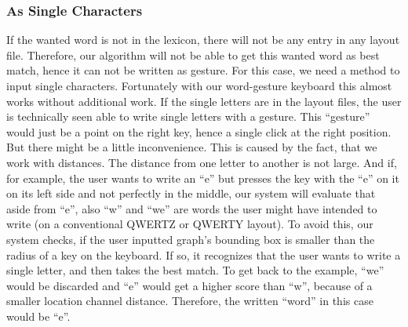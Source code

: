\subsubsection{As Single Characters}
If the wanted word is not in the lexicon, there will not be any entry in any layout file. Therefore, our algorithm will not be able to get this wanted word as best match, hence it can not be written as gesture. For this case, we need a method to input single characters. Fortunately with our word-gesture keyboard this almost works without additional work. If the single letters are in the layout files, the user is technically seen able to write single letters with a gesture. This ``gesture'' would just be a point on the right key, hence a single click at the right position. But there might be a little inconvenience. This is caused by the fact, that we work with distances. The distance from one letter to another is not large. And if, for example, the user wants to write an ``e'' but presses the key with the ``e'' on it on its left side and not perfectly in the middle, our system will evaluate that aside from ``e'', also ``w'' and ``we'' are words the user might have intended to write (on a conventional QWERTZ or QWERTY layout). To avoid this, our system checks, if the user inputted graph's bounding box is smaller than the radius of a key on the keyboard. If so, it recognizes that the user wants to write a single letter, and then takes the best match. To get back to the example, ``we'' would be discarded and ``e'' would get a higher score than ``w'', because of a smaller location channel distance. Therefore, the written ``word'' in this case would be ``e''.

